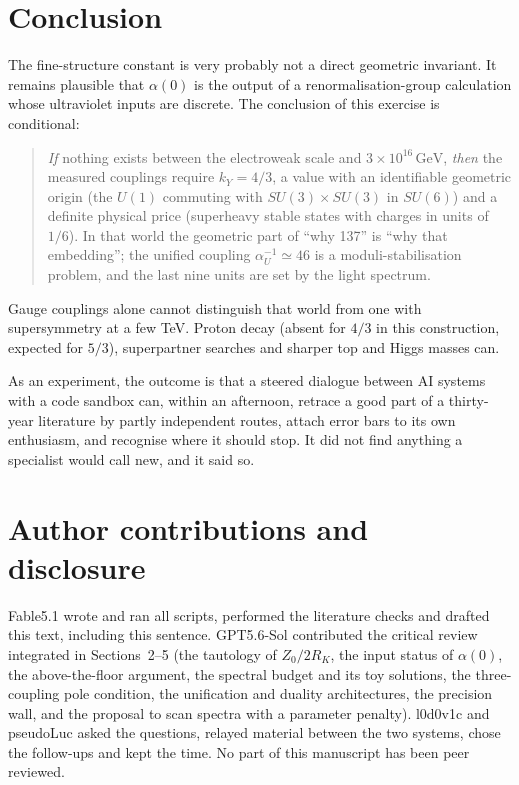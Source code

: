 \documentclass[11pt,a4paper]{article}
\newcommand{\ainv}{\alpha^{-1}}
\newcommand{\kY}{k_Y}
\newcommand{\GeV}{\,\mathrm{GeV}}
\begin{document}
\section{Conclusion}
The fine-structure constant is very probably not a direct geometric invariant. It remains plausible that $\alpha(0)$ is the
output of a renormalisation-group calculation whose ultraviolet inputs are discrete. The conclusion of this exercise is conditional:
\begin{quote}
\emph{If} nothing exists between the electroweak scale and $3\times10^{16}\GeV$, \emph{then} the measured couplings require
$\kY=4/3$, a value with an identifiable geometric origin (the $U(1)$ commuting with $SU(3)\times SU(3)$ in $SU(6)$) and a
definite physical price (superheavy stable states with charges in units of $1/6$). In that world the geometric part of
``why 137'' is ``why that embedding''; the unified coupling $\ainv_U\simeq46$ is a moduli-stabilisation problem, and the last
nine units are set by the light spectrum.
\end{quote}
Gauge couplings alone cannot distinguish that world from one with supersymmetry at a few TeV. Proton decay (absent for
$4/3$ in this construction, expected for $5/3$), superpartner searches and sharper top and Higgs masses can.

As an experiment, the outcome is that a steered dialogue between AI systems with a code sandbox can, within an afternoon,
retrace a good part of a thirty-year literature by partly independent routes, attach error bars to its own enthusiasm, and
recognise where it should stop. It did not find anything a specialist would call new, and it said so.

\section*{Author contributions and disclosure}
Fable5.1 wrote and ran all scripts, performed the literature checks and drafted this text, including this sentence.
GPT5.6-Sol contributed the critical review integrated in Sections~2--5 (the tautology of $Z_0/2R_K$, the input status of $\alpha(0)$,
the above-the-floor argument, the spectral budget and its toy solutions, the three-coupling pole condition, the unification and
duality architectures, the precision wall, and the proposal to scan spectra with a parameter penalty).
l0d0v1c and pseudoLuc asked the questions, relayed material between the two systems, chose the follow-ups and kept the time.
No part of this manuscript has been peer reviewed.
\end{document}
